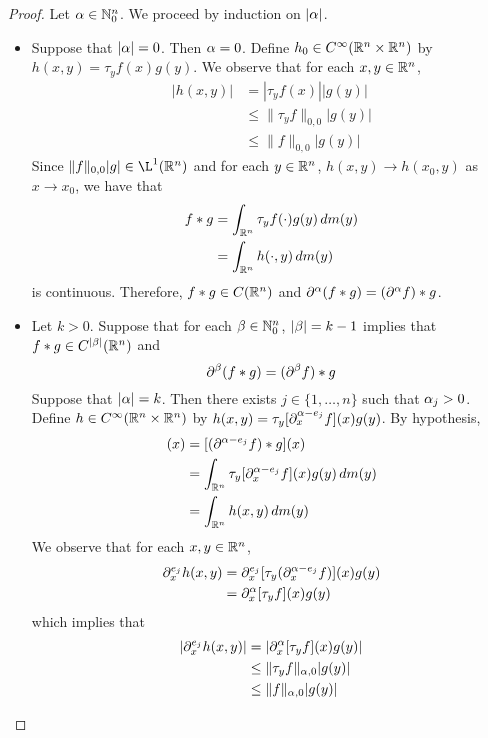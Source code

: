\documentclass{book}
\begin{document}
	\begin{proof}
			Let $\alpha \in \mathbb{N}_0^n$. We proceed by induction on $|\alpha|$.
			\begin{itemize}
				\item Suppose that $|\alpha| = 0$. Then $\alpha = 0$. Define $h_0 \in C^{\infty}(\mathbb{R}^n \times \mathbb{R}^n)$ by $h(x,y) = \tau_y  f(x)g(y)$. We observe that for each $x,y \in \mathbb{R}^n$, 
				\begin{align*}
					|h(x,y)| 
					& = |\tau_y f(x)||g(y)| \\
					& \leq \|\tau_y f\|_{0, 0} |g(y)| \\
					& \leq \|f\|_{0,0} |g(y)|
				\end{align*}
			Since $\|f\|_{0,0} |g| \in \L^1(\R^n)$ and for each $y \in \mathbb{R}^n$, $h(x,y) \rightarrow h(x_0, y)$ as $x \rightarrow x_0$, we have that 
			\begin{align*}
				f*g
				& = \int_{\mathbb{R}^n} \tau_yf (\cdot) g(y) \, d m(y) \\
				& = \int_{\mathbb{R}^n} h(\cdot,y) \, d m(y) 
			\end{align*}
			is continuous. Therefore, $f*g \in C(\mathbb{R}^n)$ and $\partial^{\alpha}(f*g) = (\partial^{\alpha}f) * g$.
			\item Let $k > 0$. Suppose that for each $\beta \in \mathbb{N}_0^n$, $|\beta| = k-1$ implies that $f*g \in C^{|\beta|}(\mathbb{R}^n)$ and 
			$$\partial^{\beta}(f*g) = (\partial^{\beta}f)*g$$ 
			Suppose that $|\alpha| = k$. Then there exists $j \in \{1, \ldots, n\}$ such that $\alpha_j > 0$. Define $h \in C^{\infty}(\mathbb{R}^n \times \mathbb{R}^n)$ by $h(x,y) = \tau_y [\partial_x^{\alpha-e_j} f](x)g(y)$. By hypothesis,
			\begin{align*}
				[\p^{\al-e_j} (f*g)](x)
				& = [(\p^{\al-e_j}f) * g](x) \\
				& = \int_{\R^n} \tau_y [\p_x^{\al-e_j} f](x)g(y) \dm(y) \\
				& = \int_{\R^n} h(x,y) \dm(y)
			\end{align*}
			We observe that for each $x,y \in \mathbb{R}^n$, 
			\begin{align*}
				\partial_x^{e_j} h(x,y)
				& = \partial_x^{e_j} [\tau_y (\partial_x^{\alpha-e_j} f)](x)g(y) \\
				& = \partial_x^{\alpha} [ \tau_y f](x)g(y) 
			\end{align*}
			which implies that
			\begin{align*}
				|\partial_x^{e_j} h(x,y)| 
				& = |\partial_x^{\alpha} [ \tau_y f](x)g(y)| \\
				& \leq \|\tau_yf\|_{\alpha,0}|g(y)| \\
				& \leq \|f\|_{\alpha,0}|g(y)|
			\end{align*} 

\end{itemize}
\end{proof}
\end{document}
